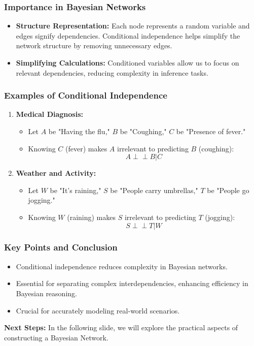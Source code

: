 \documentclass[aspectratio=169]{beamer}
\begin{document}
\begin{frame}[fragile]
    \frametitle{Importance in Bayesian Networks}
    \begin{itemize}
        \item \textbf{Structure Representation:} 
        Each node represents a random variable and edges signify dependencies. Conditional independence helps simplify the network structure by removing unnecessary edges.
        
        \item \textbf{Simplifying Calculations:} 
        Conditioned variables allow us to focus on relevant dependencies, reducing complexity in inference tasks.
    \end{itemize}
\end{frame}

\begin{frame}[fragile]
    \frametitle{Examples of Conditional Independence}
    \begin{enumerate}
        \item \textbf{Medical Diagnosis:}
        \begin{itemize}
            \item Let \(A\) be "Having the flu," \(B\) be "Coughing," \(C\) be "Presence of fever."
            \item Knowing \(C\) (fever) makes \(A\) irrelevant to predicting \(B\) (coughing):
            \[
            A \perp\!\!\!\perp B | C
            \]
        \end{itemize}
        
        \item \textbf{Weather and Activity:}
        \begin{itemize}
            \item Let \(W\) be "It’s raining," \(S\) be "People carry umbrellas," \(T\) be "People go jogging."
            \item Knowing \(W\) (raining) makes \(S\) irrelevant to predicting \(T\) (jogging):
            \[
            S \perp\!\!\!\perp T | W
            \]
        \end{itemize}
    \end{enumerate}
\end{frame}

\begin{frame}[fragile]
    \frametitle{Key Points and Conclusion}
    \begin{itemize}
        \item Conditional independence reduces complexity in Bayesian networks.
        \item Essential for separating complex interdependencies, enhancing efficiency in Bayesian reasoning.
        \item Crucial for accurately modeling real-world scenarios.
    \end{itemize}
    \textbf{Next Steps:} In the following slide, we will explore the practical aspects of constructing a Bayesian Network.
\end{frame}
\end{document}
